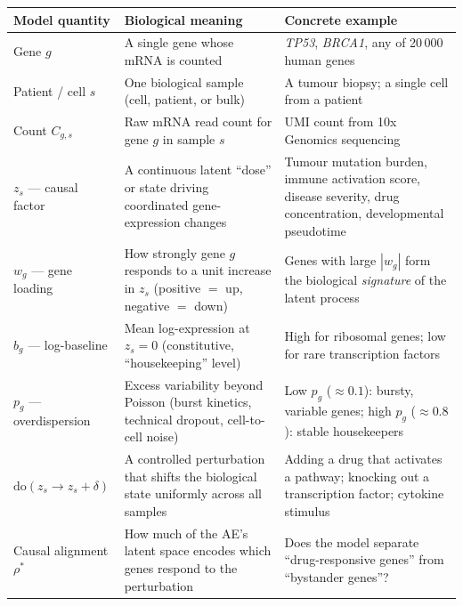 \documentclass[11pt,a4paper]{article}
\theoremstyle{definition}
\begin{document}
\begin{center}
\renewcommand{\arraystretch}{1.35}
\begin{tabular}{p{2.9cm} p{4.4cm} p{5.8cm}}
\toprule
\textbf{Model quantity} & \textbf{Biological meaning} & \textbf{Concrete example}\\
\midrule
Gene $g$ &
  A single gene whose mRNA is counted &
  \textit{TP53}, \textit{BRCA1}, any of 20\,000 human genes\\

Patient / cell $s$ &
  One biological sample (cell, patient, or bulk) &
  A tumour biopsy; a single cell from a patient\\

Count $C_{g,s}$ &
  Raw mRNA read count for gene $g$ in sample $s$ &
  UMI count from 10x Genomics sequencing\\

$z_s$ — causal factor &
  A continuous latent ``dose'' or state driving
  coordinated gene-expression changes &
  Tumour mutation burden, immune activation score,
  disease severity, drug concentration,
  developmental pseudotime\\

$w_g$ — gene loading &
  How strongly gene $g$ responds to a unit increase
  in $z_s$ (positive $=$ up, negative $=$ down) &
  Genes with large $|w_g|$ form the biological
  \emph{signature} of the latent process\\

$b_g$ — log-baseline &
  Mean log-expression at $z_s = 0$
  (constitutive, ``housekeeping'' level) &
  High for ribosomal genes; low for rare
  transcription factors\\

$p_g$ — overdispersion &
  Excess variability beyond Poisson (burst kinetics,
  technical dropout, cell-to-cell noise) &
  Low $p_g$ ($\approx 0.1$): bursty, variable genes;
  high $p_g$ ($\approx 0.8$): stable housekeepers\\

\midrule
$\mathrm{do}(z_s \!\to\! z_s\!+\!\delta)$ &
  A controlled perturbation that shifts the
  biological state uniformly across all samples &
  Adding a drug that activates a pathway; knocking
  out a transcription factor; cytokine stimulus\\

Causal alignment $\rho^*$ &
  How much of the AE's latent space encodes
  which genes respond to the perturbation &
  Does the model separate ``drug-responsive genes''
  from ``bystander genes''?\\
\bottomrule
\end{tabular}
\end{center}
\end{document}
